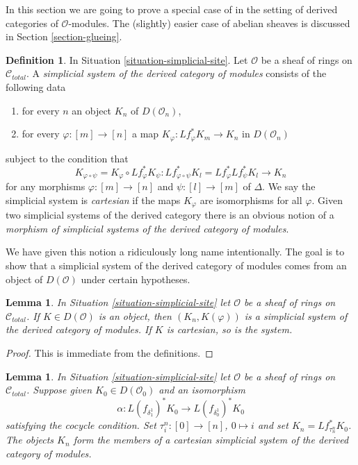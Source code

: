 \documentclass{stacks-project}
\theoremstyle{plain}
\newtheorem{lemma}[subsection]{Lemma}
\theoremstyle{definition}
\newtheorem{definition}[subsection]{Definition}
\theoremstyle{remark}
\numberwithin{equation}{subsection}
\begin{document}
\noindent
In this section we are going to prove a special case of
\cite[Proposition 3.2.9]{BBD} in the setting of derived
categories of $\mathcal{O}$-modules. The (slightly) easier
case of abelian sheaves is discussed in Section \ref{section-glueing}.

\begin{definition}
\label{definition-cartesian-derived-modules}
In Situation \ref{situation-simplicial-site}. Let $\mathcal{O}$
be a sheaf of rings on $\mathcal{C}_{total}$. A
{\it simplicial system of the derived category of modules}
consists of the following data
\begin{enumerate}
\item for every $n$ an object $K_n$ of $D(\mathcal{O}_n)$,
\item for every $\varphi : [m] \to [n]$ a map
$K_\varphi : Lf_\varphi^*K_m \to K_n$ in $D(\mathcal{O}_n)$
\end{enumerate}
subject to the condition that
$$
K_{\varphi \circ \psi} = K_\varphi \circ Lf_\varphi^*K_\psi :
Lf_{\varphi \circ \psi}^*K_l = Lf_\varphi^* Lf_\psi^*K_l
\longrightarrow
K_n
$$
for any morphisms $\varphi : [m] \to [n]$ and $\psi : [l] \to [m]$ of $\Delta$.
We say the simplicial system is {\it cartesian} if the maps $K_\varphi$
are isomorphisms for all $\varphi$.
Given two simplicial systems of the derived category
there is an obvious notion of a
{\it morphism of simplicial systems of the derived category of modules}.
\end{definition}

\noindent
We have given this notion a ridiculously long name intentionally.
The goal is to show that a simplicial system of the derived category
of modules comes from an object of $D(\mathcal{O})$ under certain
hypotheses.

\begin{lemma}
\label{lemma-cartesian-objects-derived-modules}
In Situation \ref{situation-simplicial-site} let $\mathcal{O}$ be a
sheaf of rings on $\mathcal{C}_{total}$.
If $K \in D(\mathcal{O})$ is an object, then $(K_n, K(\varphi))$
is a simplicial system of the derived category of modules.
If $K$ is cartesian, so is the system.
\end{lemma}

\begin{proof}
This is immediate from the definitions.
\end{proof}

\begin{lemma}
\label{lemma-construct-cartesian-objects-derived-modules}
In Situation \ref{situation-simplicial-site} let $\mathcal{O}$ be a
sheaf of rings on $\mathcal{C}_{total}$.
Suppose given $K_0 \in D(\mathcal{O}_0)$ and an isomorphism
$$
\alpha :
L(f_{\delta_1^1})^*K_0
\longrightarrow
L(f_{\delta_0^1})^*K_0
$$
satisfying the cocycle condition. Set $\tau^n_i : [0] \to [n]$, $0 \mapsto i$
and set $K_n = Lf_{\tau^n_n}^*K_0$. The objects $K_n$ form the members of a 
cartesian simplicial system of the derived category of modules.
\end{lemma}
\end{document}
